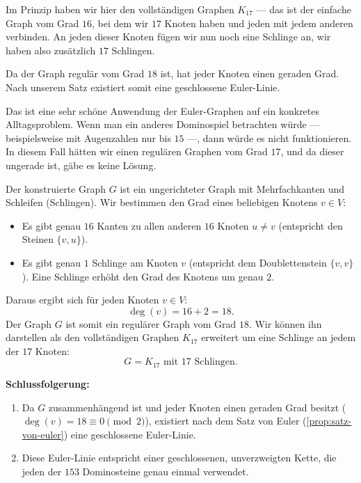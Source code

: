 \begin{spoken-clean}[00:29:55 - 00:31:34]
Im Prinzip haben wir hier den vollständigen Graphen $K_{17}$ --- das ist der einfache Graph vom Grad $16$, bei dem wir $17$ Knoten haben und jeden mit jedem anderen verbinden. An jeden dieser Knoten fügen wir nun noch eine Schlinge an, wir haben also zusätzlich $17$ Schlingen.

Da der Graph regulär vom Grad $18$ ist, hat jeder Knoten einen geraden Grad. Nach unserem Satz existiert somit eine geschlossene Euler-Linie.

Das ist eine sehr schöne Anwendung der Euler-Graphen auf ein konkretes Alltagsproblem. Wenn man ein anderes Dominospiel betrachten würde --- beispielsweise mit Augenzahlen nur bis $15$ ---, dann würde es nicht funktionieren. In diesem Fall hätten wir einen regulären Graphen vom Grad $17$, und da dieser ungerade ist, gäbe es keine Lösung.
\end{spoken-clean}

\begin{math-stroke}
\begin{ai-global-state-checkpoint-invisible-content}
\end{ai-global-state-checkpoint-invisible-content}

Der konstruierte Graph $G$ ist ein ungerichteter Graph mit Mehrfachkanten und Schleifen (Schlingen). Wir bestimmen den Grad eines beliebigen Knotens $v \in V$:
\begin{itemize}
    \item Es gibt genau $16$ Kanten zu allen anderen $16$ Knoten $u \neq v$ (entspricht den Steinen $\{v, u\}$).
    \item Es gibt genau $1$ Schlinge am Knoten $v$ (entspricht dem Doublettenstein $\{v, v\}$). Eine Schlinge erhöht den Grad des Knotens um genau $2$.
\end{itemize}
Daraus ergibt sich für jeden Knoten $v \in V$:
\[
\deg(v) = 16 + 2 = 18.
\]
Der Graph $G$ ist somit ein regulärer Graph vom Grad $18$. Wir können ihn darstellen als den vollständigen Graphen $K_{17}$ erweitert um eine Schlinge an jedem der $17$ Knoten:
\[
G = K_{17} \text{ mit } 17 \text{ Schlingen.}
\]

\textbf{Schlussfolgerung:}
\begin{enumerate}[label=\textbf{\arabic*.}]
    \item Da $G$ zusammenhängend ist und jeder Knoten einen geraden Grad besitzt ($\deg(v) = 18 \equiv 0 \pmod 2$), existiert nach dem Satz von Euler (\cref{prop:satz-von-euler}) eine geschlossene Euler-Linie.
    \item Diese Euler-Linie entspricht einer geschlossenen, unverzweigten Kette, die jeden der $153$ Dominosteine genau einmal verwendet.
\end{enumerate}
\end{math-stroke}

